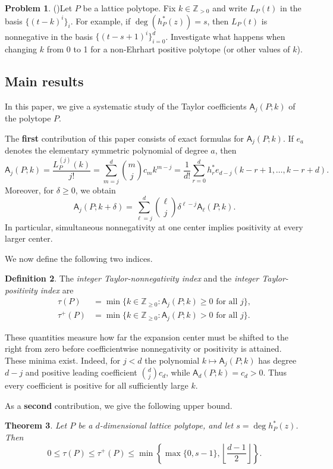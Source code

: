 \documentclass[reqno, 12pt]{article}
\numberwithin{equation}{section}
\newtheorem{theorem}{Theorem}[section]
\theoremstyle{definition}
\newtheorem{definition}[theorem]{Definition}
\newtheorem{problem}[theorem]{Problem}
\newcommand{\N}{\mathbb{Z}_{\geq 0}}
\newcommand{\A}{\mathsf{A}}
\begin{document}
\begin{problem}(\cite[Problem 1.6]{AimPl-Website})\label{Problem-Join-open}
Let $P$ be a lattice polytope. Fix $k\in \mathbb{Z}_{>0}$ and write $L_P(t)$ in the basis $\{ (t-k)^i\}_i$.
For example, if $\deg(h_P^*(z))=s$, then $L_P(t)$ is nonnegative in the basis  $\{ (t-s+1)^i\}_{i=0}^d$.
Investigate what happens when changing $k$ from 0 to 1 for a non-Ehrhart positive polytope (or other values of $k$).  
\end{problem}


\subsection{Main results}


In this paper, we give a systematic study of the Taylor coefficients $\A_j(P;k)$ of the polytope $P$.

The \textbf{first} contribution of this paper consists of exact formulas for $\A_j(P;k)$.
If $e_a$ denotes the elementary symmetric polynomial of degree $a$, then
\[\A_j(P;k)=\frac{L_P^{(j)}(k)}{j!}=\sum_{m=j}^{d}\binom{m}{j}c_mk^{m-j}
 =\frac1{d!}\sum_{r=0}^{d}h_r^*e_{d-j}(k-r+1,\ldots,k-r+d).
\]
Moreover, for $\delta\geq0$, we obtain
\[\A_j(P;k+\delta)=\sum_{\ell=j}^{d}\binom{\ell}{j}\delta^{\ell-j}\A_\ell(P;k).
\]
In particular, simultaneous nonnegativity at one center implies positivity at every larger center.


We now define the following two indices. 

\begin{definition}\label{def:positivity-indices}
The \emph{integer Taylor-nonnegativity index} and the \emph{integer Taylor-positivity index} are
\begin{align*}
 \tau(P)&=\min\{k\in\N:\A_j(P;k)\geq0\text{ for all }j\},\\
 \tau^+(P)&=\min\{k\in\N:\A_j(P;k)>0\text{ for all }j\}.
\end{align*}
\end{definition}
These quantities measure how far the expansion center must be shifted to the right from zero before coefficientwise nonnegativity or positivity is attained.
These minima exist.  Indeed, for $j<d$ the polynomial $k\mapsto\A_j(P;k)$ has degree $d-j$ and positive leading coefficient
$\binom{d}{j}c_d$, while $\A_d(P;k)=c_d>0$.  Thus every coefficient is positive for all sufficiently large $k$.


As a \textbf{second} contribution, we give the following upper bound.
\begin{theorem}\label{Intorodct-One}
Let $P$ be a $d$-dimensional lattice polytope, and let $s=\deg h_P^*(z)$.  Then
\[ 0\leq\tau(P)\leq\tau^+(P)\leq\min\left\{\max\{0,s-1\},\left\lfloor\frac{d-1}{2}\right\rfloor\right\}.
\]
\end{theorem}
\end{document}

